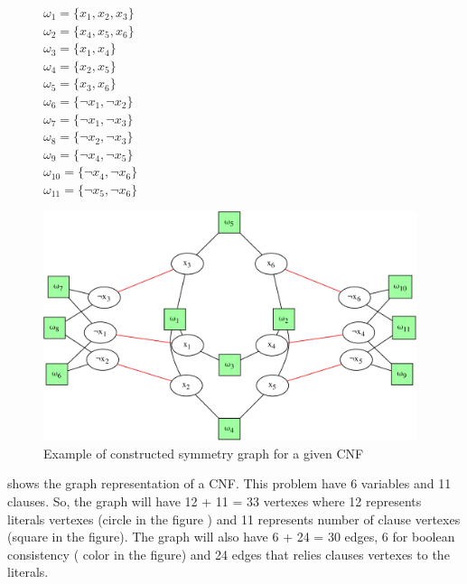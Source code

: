 \begin{figure}[h!]
	\begin{minipage}[c]{.2\textwidth}
		$\omega_{1} = \{ x_{1}, x_{2}, x_{3} \}$ \\
		$\omega_{2} = \{ x_{4}, x_{5}, x_{6} \}$ \\
		$\omega_{3} = \{ x_{1}, x_{4} \}$ \\
		$\omega_{4} = \{ x_{2}, x_{5} \}$ \\
		$\omega_{5} = \{ x_{3}, x_{6} \}$ \\
		$\omega_{6} = \{ \neg x_{1}, \neg x_{2} \}$ \\
		$\omega_{7} = \{ \neg x_{1}, \neg x_{3} \}$ \\
		$\omega_{8} = \{ \neg x_{2}, \neg x_{3} \}$ \\
		$\omega_{9} = \{ \neg x_{4}, \neg x_{5} \}$ \\
		$\omega_{10} = \{ \neg x_{4}, \neg x_{6} \}$ \\
		$\omega_{11} = \{ \neg x_{5}, \neg x_{6} \}$ \\
		
	\end{minipage}
	\begin{minipage}[l]{.75\textwidth}
		\includegraphics[width=4.3in]{cnfs/graph_cnf_no_opt-crop}
	\end{minipage}
 \caption{Example of constructed symmetry graph for a given CNF}
 \label{fig:graph_no_opt}
\end{figure}


 shows the graph representation of a CNF. This problem have 6 variables and 11
clauses. So, the graph will have  12  + 11 = 33 vertexes where 12 represents literals vertexes (circle in the figure ) 
and 11 represents number of clause vertexes (square in the figure). The graph will also have 6 + 24 = 30 edges, 6 for boolean consistency ( color in the figure) and 24 edges that relies clauses vertexes to the literals.


